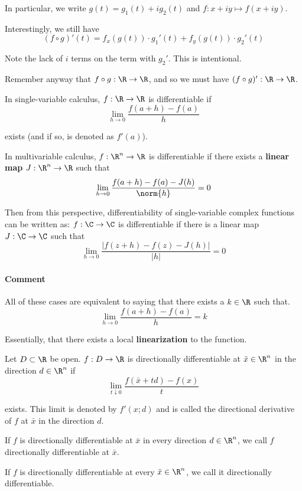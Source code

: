 In particular, we write $g(t)=g_1(t)+ig_2(t)$ and $f:x+iy\mapsto
	f(x+iy)$.

Interestingly, we still have
$$
	(f\circ g)'(t) =
	f_x(g(t))\cdot {g_1}'(t)+f_y(g(t))\cdot {g_2}'(t)
$$

Note the lack of $i$ terms on the term with ${g_2}'$. This is
intentional.

Remember anyway that $f\circ g:\R\to\R$, and so we must have $(f\circ
	g)':\R\to\R$.

\label{c62315d}

In single-variable calculus, $f:\R\to\R$ is differentiable if
$$
	\lim_{h\to0}\frac{f(a+h)-f(a)}h
$$

exists (and if so, is denoted as $f'(a)$).

In multivariable calculus, $f:\R^n\to\R$ is differentiable if there
exists a \textbf{linear map} $J:\R^n\to\R$ such that
$$
	\lim_{h\to0}\frac{f(a+h)-f(a)-J(h)}{\norm{h}}=0
$$

Then from this perspective, differentiability of single-variable
complex functions can be written as:
$f:\C\to\C$ is differentiable if there is a linear map $J:\C\to\C$ such that
$$
	\lim_{h\to0}\frac{|f(z+h)-f(z)-J(h)|}{|h|}=0
$$

\paragraph{Comment}

All of these cases are equivalent to saying that there exists a
$k\in\R$ such that.
$$
	\lim_{h\to0}\frac{f(a+h)-f(a)}h=k
$$

Essentially, that there exists a local \textbf{linearization} to the
function.

\label{dbbf530}

Let $D\subset \R$ be open. $f:D\to\R$ is directionally differentiable
at $\bar x\in\R^n$ in the direction $d\in\R^n$ if
$$
	\lim_{t\downarrow0}\frac{f(\bar x+td)-f(x)}t
$$

exists. This limit is denoted by $f'(x;d)$ and is called the
directional derivative of $f$ at $\bar x$ in the direction $d$.

If $f$ is directionally differentiable at $\bar x$ in every direction
$d\in\R^n$, we call $f$ directionally differentiable at $\bar x$.

If $f$ is directionally differentiable at every $\bar x\in\R^n$, we
call it directionally differentiable.

